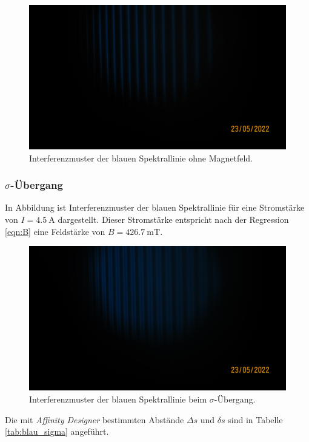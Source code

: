 \begin{figure}[H]
    \centering
    \includegraphics[scale= 0.2]{Messung/Blau[3].JPG}
    \caption{Interferenzmuster der blauen Spektrallinie ohne Magnetfeld.}
    \label{fig:blau}
\end{figure}
\noindent

\subsubsection[]{$\sigma$-Übergang}
\label{sec:sigma}

In Abbildung ist Interferenzmuster der blauen Spektrallinie für eine Stromstärke von $I=\SI{4.5}{\ampere}$
dargestellt. Dieser Stromstärke entspricht nach der Regression \ref{eqn:B} eine Feldstärke von 
$B=\SI{426.7}{\milli\tesla}$. 
\begin{figure}[H]
    \centering
    \includegraphics[scale= 0.2]{Messung/Blau_Sigma[4].JPG}
    \caption{Interferenzmuster der blauen Spektrallinie beim $\sigma$-Übergang.}
    \label{fig:blau_sigma}
\end{figure}
\noindent
Die mit \textit{Affinity Designer} \cite{affinity} bestimmten Abstände $\Delta s$ und $\delta s$ sind in Tabelle \ref{tab:blau_sigma}
angeführt.

